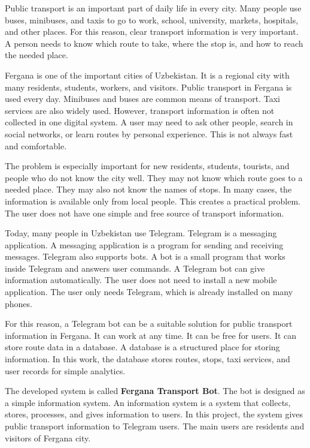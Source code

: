 
Public transport is an important part of daily life in every city. Many people use buses, minibuses, and taxis to go to work, school, university, markets, hospitals, and other places. For this reason, clear transport information is very important. A person needs to know which route to take, where the stop is, and how to reach the needed place.

Fergana is one of the important cities of Uzbekistan. \cite{stat_uz_fergana} It is a regional city with many residents, students, workers, and visitors. Public transport in Fergana is used every day. Minibuses and buses are common means of transport. Taxi services are also widely used. However, transport information is often not collected in one digital system. A user may need to ask other people, search in social networks, or learn routes by personal experience. This is not always fast and comfortable.

The problem is especially important for new residents, students, tourists, and people who do not know the city well. They may not know which route goes to a needed place. They may also not know the names of stops. In many cases, the information is available only from local people. This creates a practical problem. The user does not have one simple and free source of transport information.

Today, many people in Uzbekistan use Telegram. \cite{datareportal_uz_2024} Telegram is a messaging application. A messaging application is a program for sending and receiving messages. Telegram also supports bots. A bot is a small program that works inside Telegram and answers user commands. A Telegram bot can give information automatically. The user does not need to install a new mobile application. The user only needs Telegram, which is already installed on many phones.

For this reason, a Telegram bot can be a suitable solution for public transport information in Fergana. It can work at any time. It can be free for users. It can store route data in a database. A database is a structured place for storing information. In this work, the database stores routes, stops, taxi services, and user records for simple analytics.

The developed system is called \textbf{Fergana Transport Bot}. The bot is designed as a simple information system. An information system is a system that collects, stores, processes, and gives information to users. In this project, the system gives public transport information to Telegram users. The main users are residents and visitors of Fergana city.

